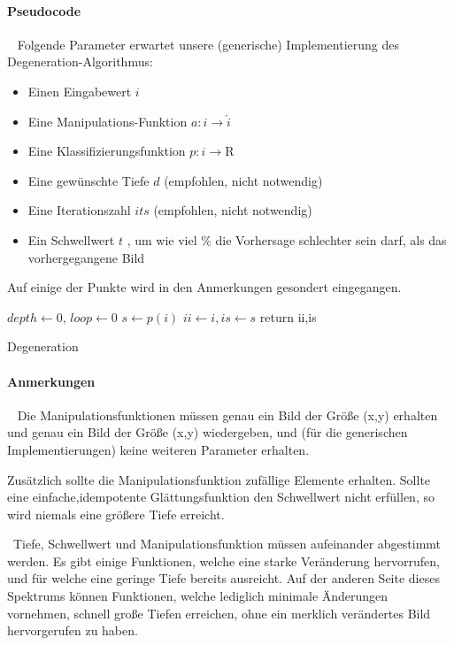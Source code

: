 \paragraph{Pseudocode} ~\newline 
Folgende Parameter erwartet unsere (generische) Implementierung des Degeneration-Algorithmus: 
\begin{itemize}
	\item Einen Eingabewert $i$
	\item Eine Manipulations-Funktion $a : i \rightarrow \hat{i}$
	\item Eine Klassifizierungsfunktion $p : i \rightarrow \mathrm{R}$
	\item Eine gewünschte Tiefe $d$ (empfohlen, nicht notwendig)
	\item Eine Iterationszahl $its$ (empfohlen, nicht notwendig)
	\item Ein Schwellwert $t$ , um wie viel \% die Vorhersage schlechter sein darf, als das vorhergegangene Bild 
\end{itemize}
Auf einige der Punkte wird in den Anmerkungen gesondert eingegangen. ~\newline
\IncMargin{1em}
\begin{algorithm}
	\BlankLine
	$depth  \leftarrow 0$, $loop \leftarrow0$ \;
	$s \leftarrow p(i)$\;
	$ii \leftarrow i , is \leftarrow s$ \;
	return ii,is\;
	
	\caption{Degeneration}\label{algo_degen}
\end{algorithm}\DecMargin{1em}
\newpage
\paragraph{Anmerkungen}~\newline 
Die Manipulationsfunktionen müssen genau ein Bild der Größe (x,y) erhalten und genau ein Bild der Größe (x,y) wiedergeben, und (für die generischen Implementierungen) keine weiteren Parameter erhalten. 

Zusätzlich sollte die Manipulationsfunktion zufällige Elemente erhalten. Sollte eine einfache,idempotente Glättungsfunktion den Schwellwert nicht erfüllen, so wird niemals eine größere Tiefe erreicht.  

~\newline Tiefe, Schwellwert und Manipulationsfunktion müssen aufeinander abgestimmt werden. Es gibt einige Funktionen, welche eine starke Veränderung hervorrufen, und für welche eine geringe Tiefe bereits ausreicht. Auf der anderen Seite dieses Spektrums können Funktionen, welche lediglich minimale Änderungen vornehmen, schnell große Tiefen erreichen, ohne ein merklich verändertes Bild hervorgerufen zu haben. 

